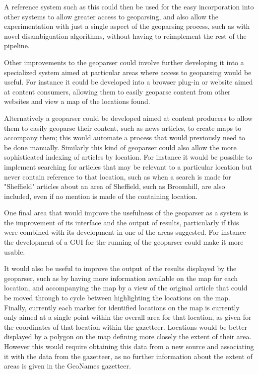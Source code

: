 \documentclass[12pt, a4paper]{report}
\begin{document}
A reference system such as this could then be used for the easy incorporation into other systems to allow greater access to geoparsing, and also allow the experimentation with just a single aspect of the geoparsing process, such as with novel disambiguation algorithms, without having to reimplement the rest of the pipeline.

Other improvements to the geoparser could involve further developing it into a specialized system aimed at particular areas where access to geoparsing would be useful. For instance it could be developed into a browser plug-in or website aimed at content consumers, allowing them to easily geoparse content from other websites and view a map of the locations found.

Alternatively a geoparser could be developed aimed at content producers to allow them to easily geoparse their content, such as news articles, to create maps to accompany them; this would automate a process that would previously need to be done manually. Similarly this kind of geoparser could also allow the more sophisticated indexing of articles by location. For instance it would be possible to implement searching for articles that may be relevant to a particular location but never contain reference to that location, such as when a search is made for "Sheffield" articles about an area of Sheffield, such as Broomhill, are also included, even if no mention is made of the containing location.

One final area that would improve the usefulness of the geoparser as a system is the improvement of its interface and the output of results, particularly if this were combined with its development in one of the areas suggested. For instance the development of a GUI for the running of the geoparser could make it more usable.

It would also be useful to improve the output of the results displayed by the geoparser, such as by having more information available on the map for each location, and accompanying the map by a view of the original article that could be moved through to cycle between highlighting the locations on the map. Finally, currently each marker for identified locations on the map is currently only aimed at a single point within the overall area for that location, as given for the coordinates of that location within the gazetteer. Locations would be better displayed by a polygon on the map defining more closely the extent of their area. However this would require obtaining this data from a new source and associating it with the data from the gazetteer, as no further information about the extent of areas is given in the GeoNames gazetteer.
\end{document}
